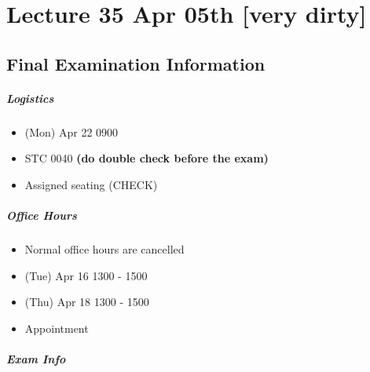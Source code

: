 \documentclass[notoc,notitlepage,nobib]{tufte-book}
\begin{document}


\chapter{Lecture 35 Apr 05th [very dirty]}%
\label{chp:lecture_35_apr_05th}

\section{Final Examination Information}%
\label{sec:final_examination_information}

\paragraph{Logistics}

\begin{itemize}
  \item (Mon) Apr 22 0900
  \item STC 0040 \textbf{(do double check before the exam)}
  \item Assigned seating (CHECK)
\end{itemize}

\paragraph{Office Hours}

\begin{itemize}
  \item Normal office hours are cancelled
  \item (Tue) Apr 16 1300 - 1500
  \item (Thu) Apr 18 1300 - 1500
  \item Appointment
\end{itemize}

\paragraph{Exam Info}
\end{document}
